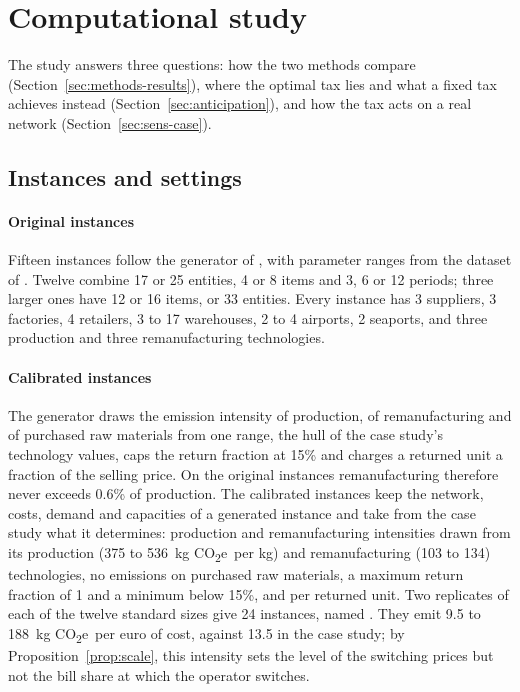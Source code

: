 \documentclass[review,11pt,nonatbib]{elsarticle}
\theoremstyle{remark}
\newcommand{\inst}[1]{\texttt{\detokenize{#1}}}
\newcommand{\EUR}{\texteuro}
\newcommand{\CO}{CO\textsubscript{2}e}
\begin{document}
\section{Computational study}\label{sec:results}

The study answers three questions: how the two methods compare (Section~\ref{sec:methods-results}), where the optimal tax lies and what a fixed tax achieves instead (Section~\ref{sec:anticipation}), and how the tax acts on a real network (Section~\ref{sec:sens-case}).

\subsection{Instances and settings}\label{sec:instances}

\paragraph{Original instances} Fifteen instances follow the generator of \textcite{tautenhain2021efficient}, with parameter ranges from the dataset of \textcite{tautenhain2021data}. Twelve combine 17 or 25 entities, 4 or 8 items and 3, 6 or 12 periods; three larger ones have 12 or 16 items, or 33 entities. Every instance has 3 suppliers, 3 factories, 4 retailers, 3 to 17 warehouses, 2 to 4 airports, 2 seaports, and three production and three remanufacturing technologies.
\paragraph{Calibrated instances} The generator draws the emission intensity of production, of remanufacturing and of purchased raw materials from one range, the hull of the case study's technology values, caps the return fraction at 15\% and charges a returned unit a fraction of the selling price. On the original instances remanufacturing therefore never exceeds 0.6\% of production. The calibrated instances keep the network, costs, demand and capacities of a generated instance and take from the case study what it determines: production and remanufacturing intensities drawn from its production (375 to 536~kg \CO\ per kg) and remanufacturing (103 to 134) technologies, no emissions on purchased raw materials, a maximum return fraction of 1 and a minimum below 15\%, and \EUR0.15 per returned unit. Two replicates of each of the twelve standard sizes give 24 instances, named \inst{CAL_<size>_r<k>}. They emit 9.5 to 188~kg \CO\ per euro of cost, against 13.5 in the case study; by Proposition~\ref{prop:scale}, this intensity sets the level of the switching prices but not the bill share at which the operator switches.
\end{document}
